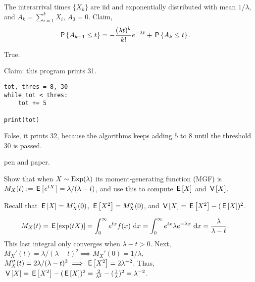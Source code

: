\documentclass[stochastic-or.tex]{subfiles}
\begin{document}
\begin{truefalse}
The interarrival times $\{X_k\}$ are iid and exponentially distributed with mean $1/\lambda$, and $A_k = \sum_{i=1}^k X_i$, $A_{0} = 0$.
Claim,
\begin{equation*}
 \begin{split}
\P{A_{k+1} \leq t}
&= - \frac{(\lambda t)^{k}}{k!} e^{-\lambda t} + \P{A_k \leq t}.
 \end{split}
\end{equation*}
\begin{solution}
 True.
\end{solution}
\end{truefalse}

\begin{truefalse}
Claim: this program prints 31.
\begin{verbatim}
tot, thres = 8, 30
while tot < thres:
    tot += 5

print(tot)
\end{verbatim}
\begin{solution}
False, it prints 32, because the algorithms keeps adding $5$ to 8 until the threshold 30 is passed.
\end{solution}
\end{truefalse}


 pen and paper.

\begin{exercise}\label{ex:11}
Show that when $X\sim \Exp{\lambda}$ its moment-generating function (MGF) is $ M_X(t) := \E{e^{tX}} = \lambda/(\lambda -t)$, and use this to compute $\E X$ and $\V X$.
\begin{hint}
Recall that $\E X = M_{X}'(0)$, $\E{X^{2}} = M_{X}''(0)$, and $\V X = \E{X^{2}} - (\E X)^{2}$.
\end{hint}
\begin{solution}
 \begin{align*}
 M_X(t) &= \E{\exp(t X)}
=\int_0^\infty e^{tx} f(x) \,\d x
=\int_0^\infty e^{tx} \lambda e^{-\lambda x} \,\d x =\frac{\lambda}{\lambda -t}.
 \end{align*}
This last integral only converges when $\lambda -t > 0$. Next, $M_X'(t)=\lambda/(\lambda-t)^2 \implies M_X'(0)=1/\lambda$, $M_X''(t)=2\lambda/(\lambda-t)^3 \implies \E{X^2}=2\lambda^{-2}$.
Thus, $\V X = \E{X^2} - (\E X)^2 = \frac{2}{\lambda^2} - (\frac{1}{\lambda})^2 = \lambda^{-2}$.
\end{solution}
\end{exercise}
\end{document}
